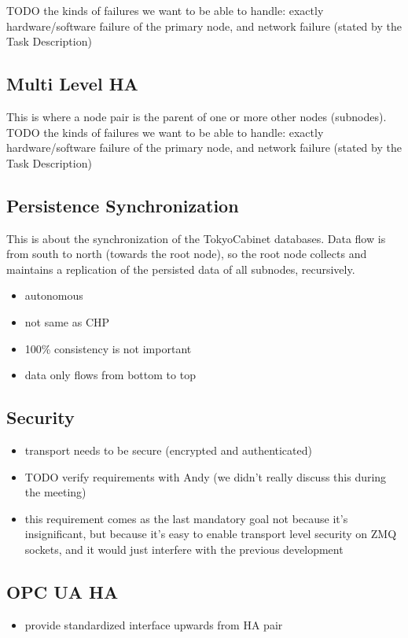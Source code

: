 TODO the kinds of failures we want to be able to handle: exactly hardware/software failure of the primary node, and network failure (stated by the Task Description)\\


\subsection{Multi Level HA}
This is where a node pair is the parent of one or more other nodes (subnodes).\\

TODO the kinds of failures we want to be able to handle: exactly hardware/software failure of the primary node, and network failure (stated by the Task Description)\\

\subsection{Persistence Synchronization}
This is about the synchronization of the TokyoCabinet databases. Data flow is from south to north (towards the root node), so the root node collects and maintains a replication of the persisted data of all subnodes, recursively.

\begin{itemize}
	\item autonomous
	\item not same as CHP
	\item 100\% consistency is not important
	\item data only flows from bottom to top
\end{itemize}

\subsection{Security}
\begin{itemize}
	\item transport needs to be secure (encrypted and authenticated)
	\item TODO verify requirements with Andy (we didn't really discuss this during the meeting)
	\item this requirement comes as the last mandatory goal not because it's insignificant, but because it's easy to enable transport level security on ZMQ sockets, and it would just interfere with the previous development
\end{itemize}

\subsection{OPC UA HA}
\begin{itemize}
	\item provide standardized interface upwards from HA pair
\end{itemize}

